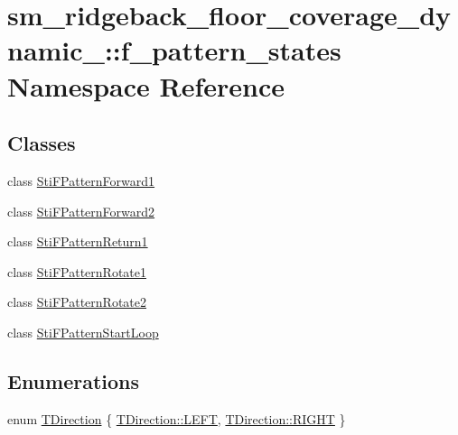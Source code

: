 \hypertarget{namespacesm__ridgeback__floor__coverage__dynamic__1_1_1f__pattern__states}{}\section{sm\+\_\+ridgeback\+\_\+floor\+\_\+coverage\+\_\+dynamic\+\_\+:\+:f\+\_\+pattern\+\_\+states Namespace Reference}
\label{namespacesm__ridgeback__floor__coverage__dynamic__1_1_1f__pattern__states}
\subsection*{Classes}
\begin{DoxyCompactItemize}
\item 
class \hyperlink{structsm__ridgeback__floor__coverage__dynamic__1_1_1f__pattern__states_1_1StiFPatternForward1}{Sti\+F\+Pattern\+Forward1}
\item 
class \hyperlink{structsm__ridgeback__floor__coverage__dynamic__1_1_1f__pattern__states_1_1StiFPatternForward2}{Sti\+F\+Pattern\+Forward2}
\item 
class \hyperlink{structsm__ridgeback__floor__coverage__dynamic__1_1_1f__pattern__states_1_1StiFPatternReturn1}{Sti\+F\+Pattern\+Return1}
\item 
class \hyperlink{structsm__ridgeback__floor__coverage__dynamic__1_1_1f__pattern__states_1_1StiFPatternRotate1}{Sti\+F\+Pattern\+Rotate1}
\item 
class \hyperlink{structsm__ridgeback__floor__coverage__dynamic__1_1_1f__pattern__states_1_1StiFPatternRotate2}{Sti\+F\+Pattern\+Rotate2}
\item 
class \hyperlink{structsm__ridgeback__floor__coverage__dynamic__1_1_1f__pattern__states_1_1StiFPatternStartLoop}{Sti\+F\+Pattern\+Start\+Loop}
\end{DoxyCompactItemize}
\subsection*{Enumerations}
\begin{DoxyCompactItemize}
\item 
enum \hyperlink{namespacesm__ridgeback__floor__coverage__dynamic__1_1_1f__pattern__states_a60ecc1007032973e1e8336636cd65018}{T\+Direction} \{ \hyperlink{namespacesm__ridgeback__floor__coverage__dynamic__1_1_1f__pattern__states_a60ecc1007032973e1e8336636cd65018a684d325a7303f52e64011467ff5c5758}{T\+Direction\+::\+L\+E\+FT}, 
\hyperlink{namespacesm__ridgeback__floor__coverage__dynamic__1_1_1f__pattern__states_a60ecc1007032973e1e8336636cd65018a21507b40c80068eda19865706fdc2403}{T\+Direction\+::\+R\+I\+G\+HT}
 \}
\end{DoxyCompactItemize}


